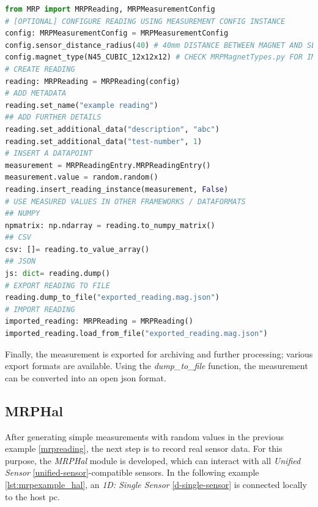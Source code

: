 \begin{lstlisting}[language=Python, caption={MRPReading example for setting up an basic measurement}, label=lst:mrpexample_reading]
from MRP import MRPReading, MRPMeasurementConfig
# [OPTIONAL] CONFIGURE READING USING MEASUREMENT CONFIG INSTANCE
config: MRPMeasurementConfig = MRPMeasurementConfig
config.sensor_distance_radius(40) # 40mm DISTANCE BETWEEN MAGNET AND SENSOR
config.magnet_type(N45_CUBIC_12x12x12) # CHECK MRPMagnetTypes.py FOR IMPLEMENTED TYPES
# CREATE READING
reading: MRPReading = MRPReading(config)
# ADD METADATA
reading.set_name("example reading")
## ADD FURTHER DETAILS
reading.set_additional_data("description", "abc")
reading.set_additional_data("test-number", 1)
# INSERT A DATAPOINT
measurement = MRPReadingEntry.MRPReadingEntry()
measurement.value = random.random()
reading.insert_reading_instance(measurement, False)
# USE MEASURED VALUES IN OTHER FRAMEWORKS / DATAFORMATS
## NUMPY
npmatrix: np.ndarray = reading.to_numpy_matrix()
## CSV
csv: []= reading.to_value_array()
## JSON
js: dict= reading.dump()
# EXPORT READING TO FILE
reading.dump_to_file("exported_reading.mag.json")
# IMPORT READING
imported_reading: MRPReading = MRPReading()
imported_reading.load_from_file("exported_reading.mag.json")
\end{lstlisting}

Finally, the measurement is exported for archiving and further
processing; various export formats are available. Using the
\emph{dump\_to\_file} function, the measurement can be converted into an
open \gls{json} format.

\hypertarget{mrphal}{%
\subsection{MRPHal}\label{mrphal}}

After generating simple measurements with random values in the previous
example \ref{mrpreading}, the next step is to record real sensor data.
For this purpose, the \emph{MRPHal} module is developed, which can
interact with all \emph{Unified Sensor} \ref{unified-sensor}-compatible
sensors. In the following example \ref{lst:mrpexample_hal}, an \emph{1D:
Single Sensor} \ref{d-single-sensor} is connected locally to the host
\gls{pc}.

